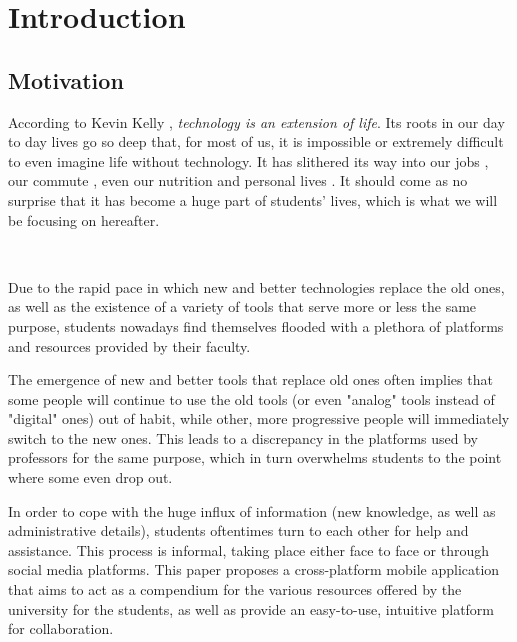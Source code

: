 \chapter{Introduction} \label{chapter1}

\section{Motivation} \label{1:motivation}

    According to Kevin Kelly \cite{kelly2010technology}, \textit{technology is an extension of life}. Its roots in our day to day lives go so deep that, for most of us, it is impossible or extremely difficult to even imagine life without technology. It has slithered its way into our jobs \cite{lewis1996studying}, our commute \cite{kairi2019technology}, even our nutrition \cite{lewis2010role} and personal lives \cite{mcquillen2003influence}. It should come as no surprise that it has become a huge part of students' lives, which is what we will be focusing on hereafter.
    
    ~
    
    Due to the rapid pace in which new and better technologies replace the old ones, as well as the existence of a variety of tools that serve more or less the same purpose, students nowadays find themselves flooded with a plethora of platforms and resources provided by their faculty.
    
    The emergence of new and better tools that replace old ones often implies that some people will continue to use the old tools (or even "analog" tools instead of "digital" ones) out of habit, while other, more progressive people will immediately switch to the new ones. This leads to a discrepancy in the platforms used by professors for the same purpose, which in turn overwhelms students to the point where some even drop out.
    
    In order to cope with the huge influx of information (new knowledge, as well as administrative details), students oftentimes turn to each other for help and assistance. This process is informal, taking place either face to face or through social media platforms.
    \clearpage
    This paper proposes a cross-platform mobile application that aims to act as a compendium for the various resources offered by the university for the students, as well as provide an easy-to-use, intuitive platform for collaboration.

